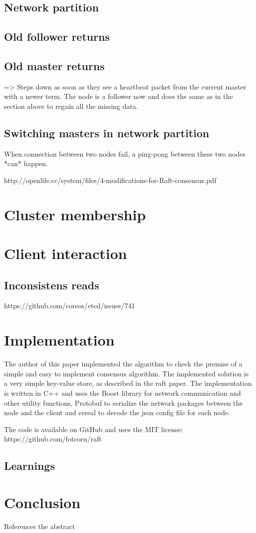\subsection{Network partition}

\subsection{Old follower returns}


\subsection{Old master returns}
=> Steps down as soon as they see a heartbeat packet from the current master with a newer term.
The node is a follower now and does the same as in the section above to regain all the missing data.

\subsection{Switching masters in network partition}
When connection between two nodes fail, a ping-pong between these two nodes *can* happen.

http://openlife.cc/system/files/4-modifications-for-Raft-consensus.pdf

\section{Cluster membership}

\section{Client interaction}
\subsection{Inconsistens reads}
https://github.com/coreos/etcd/issues/741

\section {Implementation}

The author of this paper implemented the algorithm to check the premise of a simple and easy to implement consensus algorithm. The implemented solution is a very simple key-value store, as described in the raft paper. The implementation is written in C++ and uses the Boost library for network communication and other utility functions, Protobuf to serialize the network packages between the node and the client and cereal to decode the json config file for each node.

The code is available on GitHub and uses the MIT license: https://github.com/fotcorn/raft

\subsection{Learnings}

\section{Conclusion}
References the abstract


